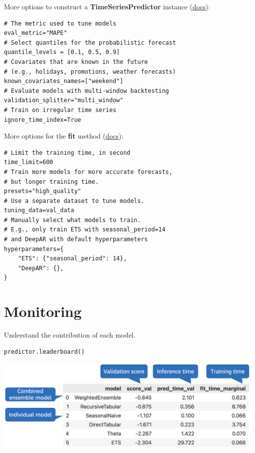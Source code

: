 More options to construct a \textbf{TimeSeriesPredictor} instance (\href{https://auto.gluon.ai/stable/api/autogluon.predictor.html#autogluon.timeseries.TimeSeriesPredictor}{docs}):

\begin{verbatim}
# The metric used to tune models
eval_metric="MAPE"
# Select quantiles for the probabilistic forecast
quantile_levels = [0.1, 0.5, 0.9]
# Covariates that are known in the future
# (e.g., holidays, promotions, weather forecasts)
known_covariates_names=["weekend"]
# Evaluate models with multi-window backtesting
validation_splitter="multi_window"
# Train on irregular time series
ignore_time_index=True
\end{verbatim}
More options for the \textbf{fit} method (\href{https://auto.gluon.ai/stable/api/autogluon.predictor.html#autogluon.timeseries.TimeSeriesPredictor.fit}{docs}):

\begin{verbatim}
# Limit the training time, in second
time_limit=600
# Train more models for more accurate forecasts, 
# but longer training time.
presets="high_quality"
# Use a separate dataset to tune models.
tuning_data=val_data
# Manually select what models to train.
# E.g., only train ETS with seasonal_period=14
# and DeepAR with default hyperparameters
hyperparameters={
    "ETS": {"seasonal_period": 14},
    "DeepAR": {},
}
\end{verbatim}



\section*{Monitoring}
Understand the contribution of each model.

\begin{verbatim}
predictor.leaderboard()
\end{verbatim}

\includegraphics[width=\linewidth]{timeseries/images/leaderboard.png}

